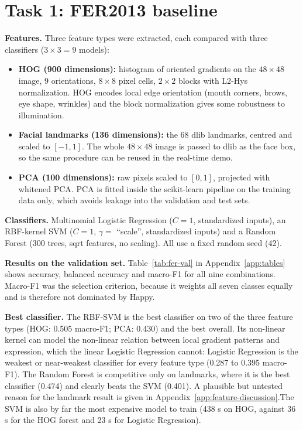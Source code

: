 \section{Task 1: FER2013 baseline}
\label{sec:task1}

\textbf{Features.} Three feature types were extracted, each compared with three classifiers ($3\times3=9$ models):
\begin{itemize}
\item \textbf{HOG (900 dimensions):} histogram of oriented gradients on the $48\times48$ image, 9 orientations, $8\times8$ pixel cells, $2\times2$ blocks with L2-Hys normalization. HOG encodes local edge orientation (mouth corners, brows, eye shape, wrinkles) and the block normalization gives some robustness to illumination.
\item \textbf{Facial landmarks (136 dimensions):} the 68 dlib landmarks, centred and scaled to $[-1, 1]$. The whole $48\times48$ image is passed to dlib as the face box, so the same procedure can be reused in the real-time demo.
\item \textbf{PCA (100 dimensions):} raw pixels scaled to $[0, 1]$, projected with whitened PCA. PCA is fitted inside the scikit-learn pipeline on the training data only, which avoids leakage into the validation and test sets.
\end{itemize}

\textbf{Classifiers.} Multinomial Logistic Regression ($C = 1$, standardized inputs), an RBF-kernel SVM ($C = 1$, $\gamma =$ ``scale'', standardized inputs) and a Random Forest (300 trees, sqrt features, no scaling). All use a fixed random seed (42).

\textbf{Results on the validation set.} Table~\ref{tab:fer-val} in Appendix~\ref{app:tables} shows accuracy, balanced accuracy and macro-F1 for all nine combinations. Macro-F1 was the selection criterion, because it weights all seven classes equally and is therefore not dominated by Happy.

\textbf{Best classifier.} The RBF-SVM is the best classifier on two of the three feature types (HOG: 0.505 macro-F1; PCA: 0.430) and the best overall. Its non-linear kernel can model the non-linear relation between local gradient patterns and expression, which the linear Logistic Regression cannot: Logistic Regression is the weakest or near-weakest classifier for every feature type (0.287 to 0.395 macro-F1). The Random Forest is competitive only on landmarks, where it is the best classifier (0.474) and clearly beats the SVM (0.401). A plausible but untested reason for the landmark result is given in Appendix~\ref{app:feature-discussion}.The SVM is also by far the most expensive model to train (438 s on HOG, against 36 s for the HOG forest and 23 s for Logistic Regression).

